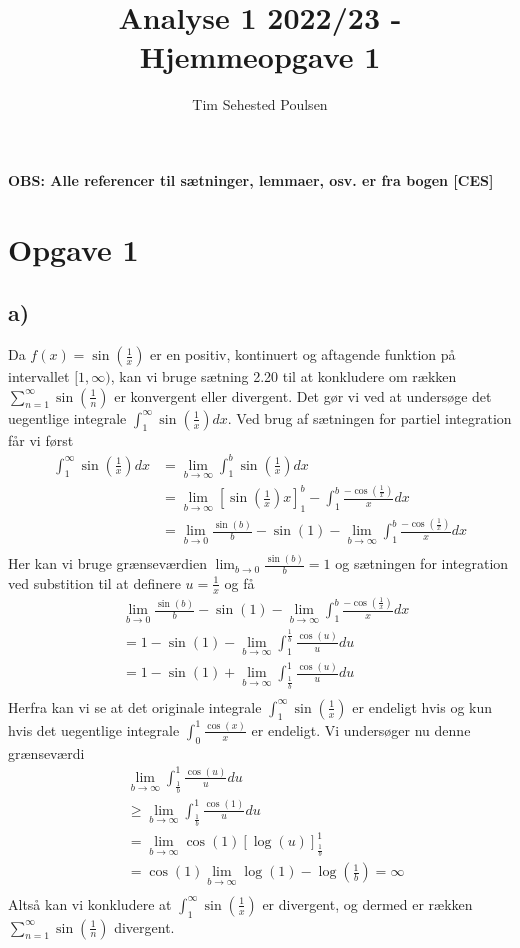 \documentclass{article}
\title{Analyse 1 2022/23 - Hjemmeopgave 1}
\author{Tim Sehested Poulsen}
\newcommand{\lrb}[1]{\left[ #1\right]}
\begin{document}
\textbf{OBS: Alle referencer til sætninger, lemmaer, osv. er fra bogen [CES]}
\section*{Opgave 1}
\subsection*{a)}
Da $f(x) = \sin(\frac{1}{x})$ er en positiv, kontinuert og aftagende 
funktion på intervallet $[1, \infty)$, kan vi bruge sætning 2.20 til at 
konkludere om rækken $\sum_{n=1}^{\infty} \sin(\frac{1}{n})$ er konvergent eller divergent.
Det gør vi ved at undersøge det uegentlige integrale $\int_1^\infty \sin(\frac{1}{x}) dx$. 
Ved brug af sætningen for partiel integration\cite[sætning 5.35]{an0} får vi først
\begin{align*}
    \int_1^\infty \sin(\frac{1}{x}) dx &= \lim_{b \to \infty} \int_1^b \sin(\frac{1}{x}) dx \\
    &= \lim_{b \to \infty} \lrb{\sin(\frac{1}{x})x}_1^{b} - \int_1^b \frac{-\cos(\frac{1}{x})}{x} dx \\ 
    &= \lim_{b \to 0} \frac{\sin(b)}{b} - \sin(1) - \lim_{b \to \infty}\int_1^b \frac{-\cos(\frac{1}{x})}{x} dx \\ 
\end{align*}
Her kan vi bruge grænseværdien $\lim_{b \to 0} \frac{\sin(b)}{b} = 1$
og sætningen for integration ved substition\cite[sætning 5.39]{an0} 
til at definere $u=\frac{1}{x}$ og få
\begin{align*}
    &\lim_{b \to 0} \frac{\sin(b)}{b} - \sin(1) - \lim_{b \to \infty}\int_1^b \frac{-\cos(\frac{1}{x})}{x} dx \\ 
    &= 1 - \sin(1) -  \lim_{b \to \infty} \int_1^{\frac{1}{b}} \frac{\cos(u)}{u} du \\ 
    &= 1 - \sin(1) +  \lim_{b \to \infty} \int_{\frac{1}{b}}^1 \frac{\cos(u)}{u} du \\
\end{align*}
Herfra kan vi se at det originale integrale $\int_1^{\infty} \sin(\frac{1}{x})$ 
er endeligt hvis og kun hvis det uegentlige integrale
$\int_0^1{\frac{\cos(x)}{x}}$ er endeligt. Vi undersøger nu denne grænseværdi
\begin{align*}
&\lim_{b \to \infty} \int_{\frac{1}{b}}^1 \frac{\cos(u)}{u} du \\
&\ge \lim_{b \to \infty} \int_{\frac{1}{b}}^1 \frac{\cos(1)}{u} du \\
&= \lim_{b \to \infty} \cos(1) \lrb{\log(u)}_{\frac{1}{b}}^1 \\
&= \cos(1) \lim_{b \to \infty} \log(1) - \log(\frac{1}{b}) = \infty \\
\end{align*}
Altså kan vi konkludere at $\int_1^{\infty} \sin(\frac{1}{x})$ er divergent, og dermed
er rækken $\sum_{n=1}^{\infty} \sin(\frac{1}{n})$ divergent.
\end{document}
